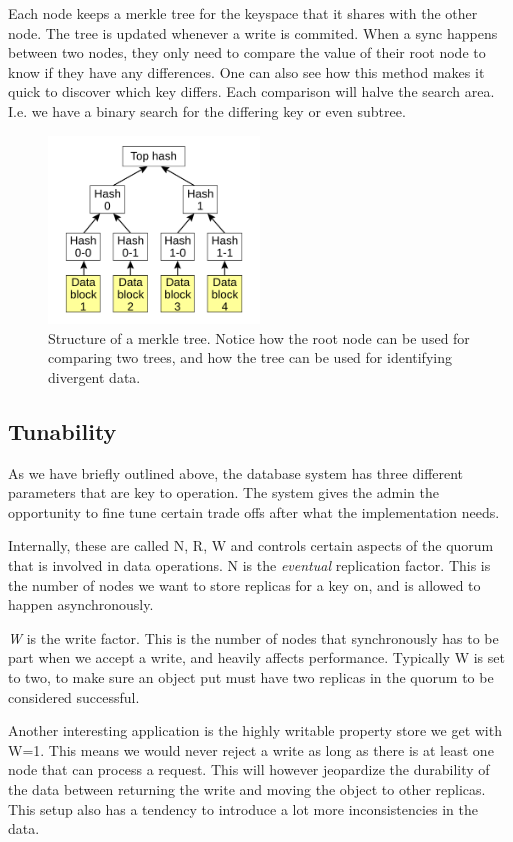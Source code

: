 Each node keeps a merkle tree for the keyspace that it shares with the other node. The tree is updated whenever a write is commited.
When a sync happens between two nodes, they only need to compare the value of their root node to know if they have any differences.
One can also see how this method makes it quick to discover which key differs. Each comparison will halve the search area.
I.e. we have a binary search for the differing key or even subtree.

\begin{figure}[h]
    \centering
    \includegraphics[width=0.5\textwidth]{background/figures/hashtree}
    \caption{Structure of a merkle tree. Notice how the root node can be used for comparing two trees, and how the tree can be used for identifying divergent data.}
    \label{fig:merkletree}
\end{figure}

\subsection{Tunability}
As we have briefly outlined above, the database system has three different parameters that are key to operation.
The system gives the admin the opportunity to fine tune certain trade offs after what the implementation needs.

Internally, these are called N, R, W and controls certain aspects of the quorum that is involved in data operations. N is the \emph{eventual} replication factor.
This is the number of nodes we want to store replicas for a key on, and is allowed to happen asynchronously.

\emph{W} is the write factor. This is the number of nodes that synchronously has to be part when we accept a write, and heavily affects performance. 
Typically W is set to two, to make sure an object put must have two replicas in the quorum to be considered successful. 

Another interesting application is the highly writable property store we get with W=1. This means we would never reject a write as long as there is at least one node that can process a request. This will however jeopardize the durability of the data between returning the write and moving the object to other replicas. This setup also has a tendency to introduce a lot more inconsistencies in the data\cite{dynamo}.

